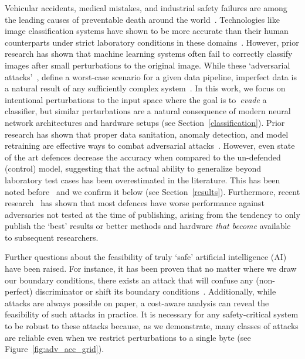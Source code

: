 Vehicular accidents, medical mistakes, and industrial safety failures are among the leading causes of preventable death around the world~\cite{OECD,makary2016medical,icoh}.
Technologies like image classification systems have shown to be more accurate than their human counterparts under strict laboratory conditions in these domains~\cite{nhtsa,pakdemirli2019artificial,bernal2017safety++}.
However, prior research has shown that machine learning systems often fail to correctly classify images after small perturbations to the original image.
While these `adversarial attacks'~\cite{chakraborty_adversarial_2018,biggio_evasion_2013-1}, define a worst-case scenario for a given data pipeline, imperfect data is a natural result of any sufficiently complex system~\cite{pearson2005mining}.
In this work, we focus on intentional perturbations to the input space where the goal is to~\emph{evade} a classifier, but similar perturbations are a natural consequence of modern neural network architectures and hardware setups (see Section~\ref{classification}).
Prior research has shown that proper data sanitation, anomaly detection, and model retraining are effective ways to combat adversarial attacks~\cite{chakraborty_adversarial_2018,grigorescu2020survey,li_general_2016,wang_security_2019}.
However, even state of the art defences decrease the accuracy when compared to the un-defended (control) model, suggesting that the actual ability to generalize beyond laboratory test cases has been overestimated in the literature.
This has been noted before~\cite{biggio_evasion_2013,carlini_towards_2017,wang_security_2019,li_general_2016} and we confirm it below (see Section~\ref{results}).
Furthermore, recent research~\cite{croce_reliable_2020} has shown that most defences have worse performance against adversaries not tested at the time of publishing, arising from the tendency to only publish the `best' results or better methods and hardware \textit{that become} available to subsequent researchers.

Further questions about the feasibility of truly `safe' artificial intelligence (AI) have been raised.
For instance, it has been proven that no matter where we draw our boundary conditions, there exists an attack that will confuse any (non-perfect) discriminator or shift its boundary conditions~\cite{dohmatob_generalized_2019}.
Additionally, while attacks are always possible on paper, a cost-aware analysis can reveal the feasibility of such attacks in practice.
It is necessary for any safety-critical system to be robust to these attacks because, as we demonstrate, many classes of attacks are reliable even when we restrict perturbations to a single byte (see Figure~\ref{fig:adv_acc_grid}).

